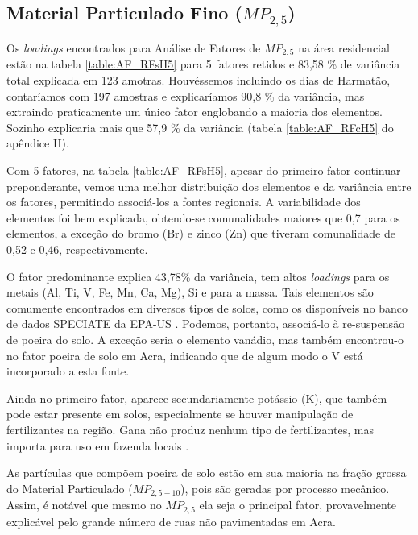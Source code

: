 \subsection{Material Particulado Fino ($MP_{2,5}$) \label{sec:pm2.5}}

Os \textit{loadings} encontrados para Análise de Fatores de $MP_{2,5}$
na área residencial estão na tabela \ref{table:AF_RFsH5} para 5 fatores retidos
e 83,58 \% de variância total explicada em 123 amotras. 
Houvéssemos incluindo os dias de Harmatão, contaríamos com 197 amostras e 
explicaríamos 90,8 \% da variância, mas extraindo praticamente um único fator 
englobando a maioria dos elementos. Sozinho explicaria mais que 57,9 \% da 
variância (tabela \ref{table:AF_RFcH5} do apêndice II).

Com 5 fatores, na tabela \ref{table:AF_RFsH5}, apesar do primeiro fator 
continuar preponderante, vemos uma melhor distribuição dos elementos e da 
variância entre os fatores, permitindo associá-los a fontes regionais.
A variabilidade dos elementos foi bem explicada, obtendo-se comunalidades 
maiores que 0,7 para os elementos, a exceção do bromo (Br) e zinco (Zn) que 
tiveram comunalidade de 0,52 e 0,46, respectivamente.

O fator predominante explica 43,78\% da variância, tem altos \textit{loadings} 
para os metais (Al, Ti, V, Fe, Mn, Ca, Mg), Si e para a massa. Tais elementos 
são comumente encontrados em diversos tipos de solos, como os disponíveis no 
banco de dados SPECIATE da EPA-US \citep{simon2010}. Podemos, portanto, 
associá-lo à re-suspensão de poeira do solo. A exceção seria o elemento vanádio,
mas \citet{aboh2009} também encontrou-o no fator poeira de solo em Acra, 
indicando que de algum modo o V está incorporado a esta fonte.

Ainda no primeiro fator, aparece secundariamente potássio (K), 
que também pode estar presente em solos, especialmente se houver manipulação 
de fertilizantes na região. Gana não produz nenhum tipo de fertilizantes,
mas importa para uso em fazenda locais \citep{fianko2011}. 

As partículas que compõem poeira de solo estão em sua maioria na fração
grossa do Material Particulado ($MP_{2,5-10}$), pois são geradas por processo 
mecânico. Assim, é notável que mesmo no $MP_{2,5}$ ela seja o principal fator, 
provavelmente explicável pelo grande número de ruas não pavimentadas em Acra. 

